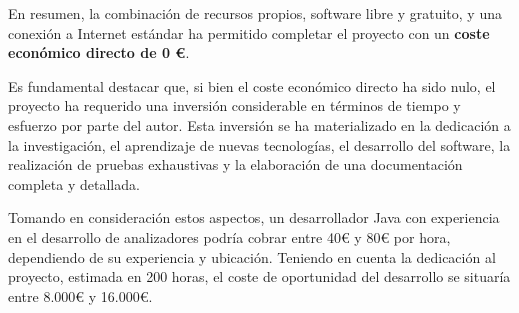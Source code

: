 En resumen, la combinación de recursos propios, software libre y gratuito, y una conexión a Internet estándar ha permitido completar el proyecto con un \textbf{coste económico directo de 0 €}.

Es fundamental destacar que, si bien el coste económico directo ha sido nulo, el proyecto ha requerido una inversión considerable en términos de tiempo y esfuerzo por parte del autor. Esta inversión se ha materializado en la dedicación a la investigación, el aprendizaje de nuevas tecnologías, el desarrollo del software, la realización de pruebas exhaustivas y la elaboración de una documentación completa y detallada.

Tomando en consideración estos aspectos, un desarrollador Java con experiencia en el desarrollo de analizadores podría cobrar entre 40€ y 80€ por hora, dependiendo de su experiencia y ubicación. Teniendo en cuenta la dedicación al proyecto, estimada en 200 horas, el coste de oportunidad del desarrollo se situaría entre 8.000€ y 16.000€.


